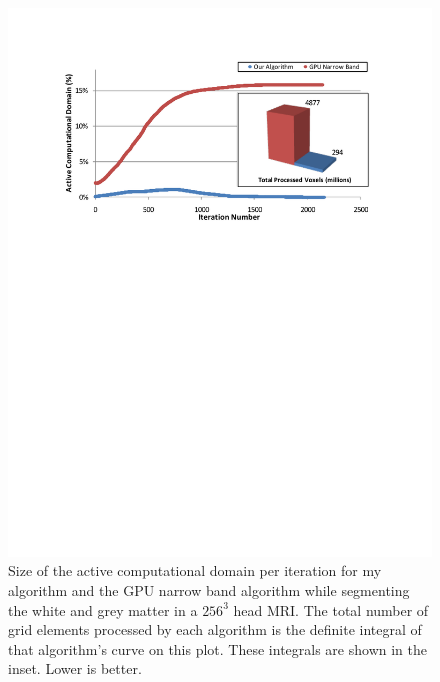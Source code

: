\begin{figure}[t]
\centering
\includegraphics[width=6.0in]{figures/SpeedA1.pdf}
\caption{Size of the active computational domain per iteration for my algorithm and the GPU narrow band algorithm while segmenting the white and grey matter in a $256^3$ head MRI. The total number of grid elements processed by each algorithm is the definite integral of that algorithm's curve on this plot. These integrals are shown in the inset. Lower is better.}
\label{fig:activecomp}
\end{figure}

